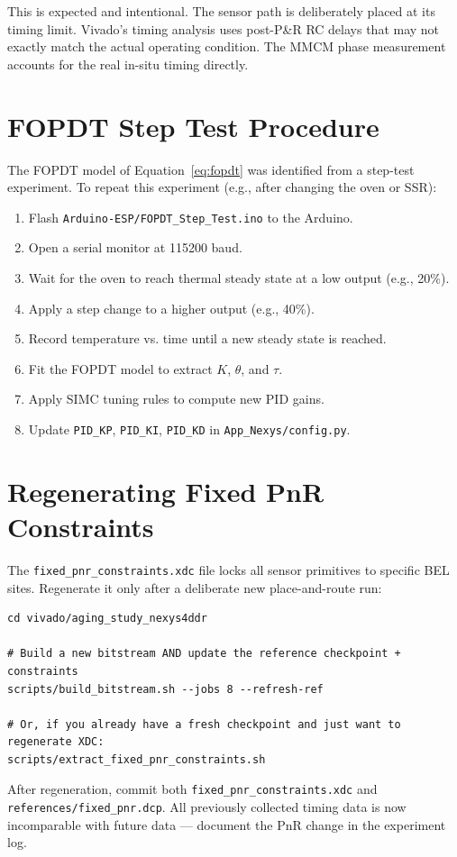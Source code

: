 \documentclass[12pt, a4paper]{report}
\begin{document}
This is expected and intentional. The sensor path is deliberately placed at its
timing limit. Vivado's timing analysis uses post-P\&R RC delays that may not
exactly match the actual operating condition. The MMCM phase measurement
accounts for the real in-situ timing directly.

\appendix
\chapter{FOPDT Step Test Procedure}

The FOPDT model of Equation~\ref{eq:fopdt} was identified from a step-test
experiment. To repeat this experiment (e.g., after changing the oven or SSR):

\begin{enumerate}
  \item Flash \texttt{Arduino-ESP/FOPDT\_Step\_Test.ino} to the Arduino.
  \item Open a serial monitor at 115200 baud.
  \item Wait for the oven to reach thermal steady state at a low output (e.g., 20\%).
  \item Apply a step change to a higher output (e.g., 40\%).
  \item Record temperature vs. time until a new steady state is reached.
  \item Fit the FOPDT model to extract $K$, $\theta$, and $\tau$.
  \item Apply SIMC tuning rules to compute new PID gains.
  \item Update \texttt{PID\_KP}, \texttt{PID\_KI}, \texttt{PID\_KD} in
        \texttt{App\_Nexys/config.py}.
\end{enumerate}

\chapter{Regenerating Fixed PnR Constraints}

The \texttt{fixed\_pnr\_constraints.xdc} file locks all sensor primitives to specific
BEL sites. Regenerate it only after a deliberate new place-and-route run:

\begin{lstlisting}[style=shell]
cd vivado/aging_study_nexys4ddr

# Build a new bitstream AND update the reference checkpoint + constraints
scripts/build_bitstream.sh --jobs 8 --refresh-ref

# Or, if you already have a fresh checkpoint and just want to regenerate XDC:
scripts/extract_fixed_pnr_constraints.sh
\end{lstlisting}

After regeneration, commit both \texttt{fixed\_pnr\_constraints.xdc} and
\texttt{references/fixed\_pnr.dcp}. All previously collected timing data
is now incomparable with future data --- document the PnR change in the
experiment log.
\end{document}
